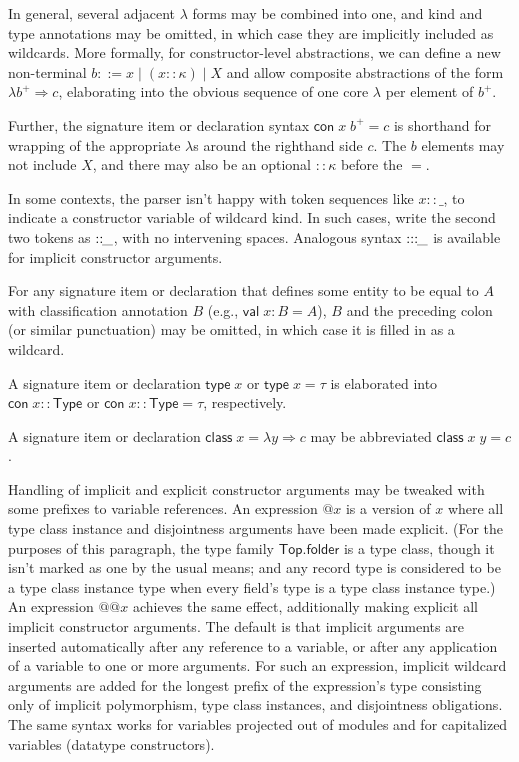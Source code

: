\documentclass{article}
\newcommand{\mt}[1]{\mathsf{#1}}
\begin{document}
In general, several adjacent $\lambda$ forms may be combined into one, and kind and type annotations may be omitted, in which case they are implicitly included as wildcards.  More formally, for constructor-level abstractions, we can define a new non-terminal $b ::= x \mid (x :: \kappa) \mid X$ and allow composite abstractions of the form $\lambda b^+ \Rightarrow c$, elaborating into the obvious sequence of one core $\lambda$ per element of $b^+$.

Further, the signature item or declaration syntax $\mt{con} \; x \; b^+ = c$ is shorthand for wrapping of the appropriate $\lambda$s around the righthand side $c$.  The $b$ elements may not include $X$, and there may also be an optional $:: \kappa$ before the $=$.

In some contexts, the parser isn't happy with token sequences like $x :: \_$, to indicate a constructor variable of wildcard kind.  In such cases, write the second two tokens as $::\hspace{-.05in}\_$, with no intervening spaces.  Analogous syntax $:::\hspace{-.05in}\_$ is available for implicit constructor arguments.

For any signature item or declaration that defines some entity to be equal to $A$ with classification annotation $B$ (e.g., $\mt{val} \; x : B = A$), $B$ and the preceding colon (or similar punctuation) may be omitted, in which case it is filled in as a wildcard.

A signature item or declaration $\mt{type} \; x$ or $\mt{type} \; x = \tau$ is elaborated into $\mt{con} \; x :: \mt{Type}$ or $\mt{con} \; x :: \mt{Type} = \tau$, respectively.

A signature item or declaration $\mt{class} \; x = \lambda y \Rightarrow c$ may be abbreviated $\mt{class} \; x \; y = c$.

Handling of implicit and explicit constructor arguments may be tweaked with some prefixes to variable references.  An expression $@x$ is a version of $x$ where all type class instance and disjointness arguments have been made explicit.  (For the purposes of this paragraph, the type family $\mt{Top.folder}$ is a type class, though it isn't marked as one by the usual means; and any record type is considered to be a type class instance type when every field's type is a type class instance type.)  An expression $@@x$ achieves the same effect, additionally making explicit all implicit constructor arguments.  The default is that implicit arguments are inserted automatically after any reference to a variable, or after any application of a variable to one or more arguments.  For such an expression, implicit wildcard arguments are added for the longest prefix of the expression's type consisting only of implicit polymorphism, type class instances, and disjointness obligations.  The same syntax works for variables projected out of modules and for capitalized variables (datatype constructors).
\end{document}

